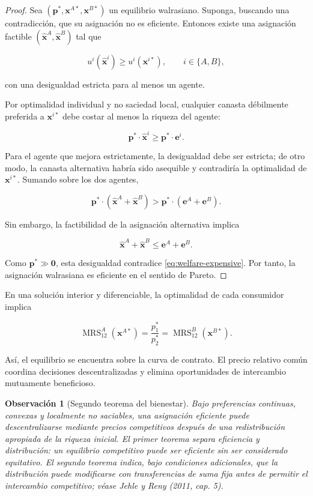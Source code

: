 \documentclass[12pt]{article}
\theoremstyle{cideplain}
\theoremstyle{cidedef}
\newtheorem{remark}[theorem]{Observación}
\DeclareMathOperator{\MRS}{MRS}
\newcommand{\p}{\mathbf{p}}
\newcommand{\e}{\bm e}
\newcommand{\x}{\mathbf{x}}
\begin{document}
\begin{proof}
Sea \((\p^*,\x^{A*},\x^{B*})\) un equilibrio walrasiano. Suponga, buscando una
contradicción, que su asignación no es eficiente. Entonces existe una asignación factible
\((\widehat{\x}^A,\widehat{\x}^B)\) tal que

\[
  u^i(\widehat{\x}^i)\geq u^i(\x^{i*}),
  \qquad i\in\{A,B\},
\]

con una desigualdad estricta para al menos un agente.

Por optimalidad individual y no saciedad local, cualquier canasta débilmente preferida a
\(\x^{i*}\) debe costar al menos la riqueza del agente:

\[
  \p^*\cdot\widehat{\x}^i
  \geq \p^*\cdot\e^i.
\]

Para el agente que mejora estrictamente, la desigualdad debe ser estricta; de otro modo,
la canasta alternativa habría sido asequible y contradiría la optimalidad de \(\x^{i*}\).
Sumando sobre los dos agentes,

\begin{equation}
  \p^*\cdot
  \left(\widehat{\x}^A+\widehat{\x}^B\right)
  >
  \p^*\cdot\left(\e^A+\e^B\right).
  \label{eq:welfare-expensive}
\end{equation}

Sin embargo, la factibilidad de la asignación alternativa implica

\[
  \widehat{\x}^A+\widehat{\x}^B
  \leq\e^A+\e^B.
\]

Como \(\p^*\gg\bm 0\), esta desigualdad contradice
\eqref{eq:welfare-expensive}. Por tanto, la asignación walrasiana es eficiente en el
sentido de Pareto.
\end{proof}

En una solución interior y diferenciable, la optimalidad de cada consumidor implica

\[
  \MRS_{12}^A(\x^{A*})
  =\frac{p_1^*}{p_2^*}
  =\MRS_{12}^B(\x^{B*}).
\]

Así, el equilibrio se encuentra sobre la curva de contrato. El precio relativo común
coordina decisiones descentralizadas y elimina oportunidades de intercambio mutuamente
beneficioso.

\begin{remark}[Segundo teorema del bienestar]
Bajo preferencias continuas, convexas y localmente no saciables, una asignación eficiente
puede descentralizarse mediante precios competitivos después de una redistribución
apropiada de la riqueza inicial. El primer teorema separa eficiencia y distribución: un
equilibrio competitivo puede ser eficiente sin ser considerado equitativo. El segundo
teorema indica, bajo condiciones adicionales, que la distribución puede modificarse con
transferencias de suma fija antes de permitir el intercambio competitivo; véase Jehle y
Reny (2011, cap. 5).
\end{remark}
\end{document}
